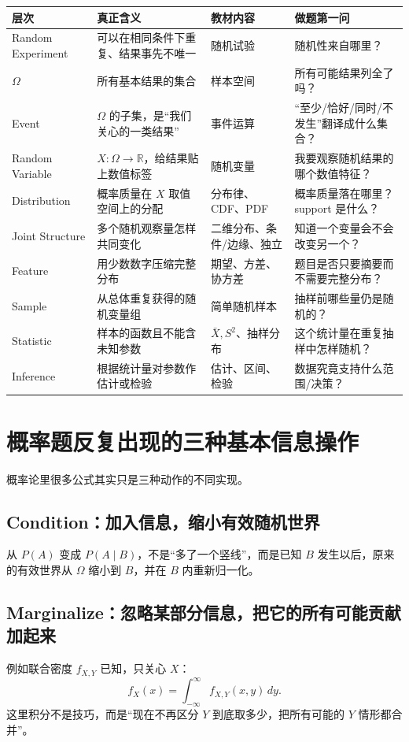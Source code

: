 \documentclass[11pt,a4paper,openany]{ctexbook}
\begin{document}
\begin{longtable}{L{2.2cm}L{4.2cm}L{3.5cm}L{\dimexpr\linewidth-10.42cm\relax}}
\toprule
\textbf{层次} & \textbf{真正含义} & \textbf{教材内容} & \textbf{做题第一问}\\
\midrule
Random Experiment & 可以在相同条件下重复、结果事先不唯一 & 随机试验 & 随机性来自哪里？\\
$\Omega$ & 所有基本结果的集合 & 样本空间 & 所有可能结果列全了吗？\\
Event & $\Omega$ 的子集，是“我们关心的一类结果” & 事件运算 & “至少/恰好/同时/不发生”翻译成什么集合？\\
Random Variable & $X:\Omega\to\mathbb R$，给结果贴上数值标签 & 随机变量 & 我要观察随机结果的哪个数值特征？\\
Distribution & 概率质量在 $X$ 取值空间上的分配 & 分布律、CDF、PDF & 概率质量落在哪里？support 是什么？\\
Joint Structure & 多个随机观察量怎样共同变化 & 二维分布、条件/边缘、独立 & 知道一个变量会不会改变另一个？\\
Feature & 用少数数字压缩完整分布 & 期望、方差、协方差 & 题目是否只要摘要而不需要完整分布？\\
Sample & 从总体重复获得的随机变量组 & 简单随机样本 & 抽样前哪些量仍是随机的？\\
Statistic & 样本的函数且不能含未知参数 & $\bar X,S^2$、抽样分布 & 这个统计量在重复抽样中怎样随机？\\
Inference & 根据统计量对参数作估计或检验 & 估计、区间、检验 & 数据究竟支持什么范围/决策？\\
\bottomrule
\end{longtable}

\section{概率题反复出现的三种基本信息操作}
概率论里很多公式其实只是三种动作的不同实现。

\subsection{Condition：加入信息，缩小有效随机世界}
从 $P(A)$ 变成 $P(A\mid B)$，不是“多了一个竖线”，而是已知 $B$ 发生以后，原来的有效世界从 $\Omega$ 缩小到 $B$，并在 $B$ 内重新归一化。

\subsection{Marginalize：忽略某部分信息，把它的所有可能贡献加起来}
例如联合密度 $f_{X,Y}$ 已知，只关心 $X$：
\[
f_X(x)=\int_{-\infty}^{\infty} f_{X,Y}(x,y)\,dy.
\]
这里积分不是技巧，而是“现在不再区分 $Y$ 到底取多少，把所有可能的 $Y$ 情形都合并”。
\end{document}

